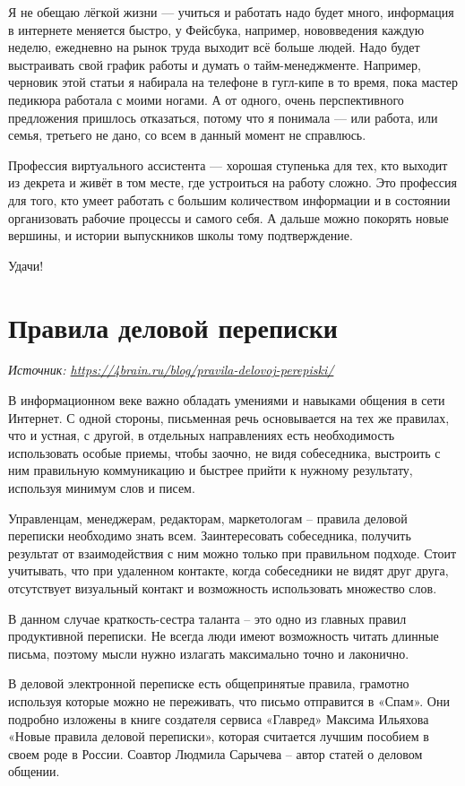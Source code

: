Я не обещаю лёгкой жизни --- учиться и работать надо будет много, информация в интернете меняется быстро, у Фейсбука, например, нововведения каждую неделю, ежедневно на рынок труда выходит всё больше людей. Надо будет выстраивать свой график работы и думать о тайм-менеджменте. Например, черновик этой статьи я набирала на телефоне в гугл-кипе в то время, пока мастер педикюра работала с моими ногами. А от одного, очень перспективного предложения пришлось отказаться, потому что я понимала --- или работа, или семья, третьего не дано, со всем в данный момент не справлюсь.

Профессия виртуального ассистента --- хорошая ступенька для тех, кто выходит из декрета и живёт в том месте, где устроиться на работу сложно. Это профессия для того, кто умеет работать с большим количеством информации и в состоянии организовать рабочие процессы и самого себя. А дальше можно покорять новые вершины, и истории выпускников школы тому подтверждение.

Удачи!

\section{Правила деловой переписки}

\textit{Источник: \url{https://4brain.ru/blog/pravila-delovoj-perepiski/}}

В информационном веке важно обладать умениями и навыками общения в сети Интернет. С одной стороны, письменная речь основывается на тех же правилах, что и устная, с другой, в отдельных направлениях есть необходимость использовать особые приемы, чтобы заочно, не видя собеседника, выстроить с ним правильную коммуникацию и быстрее прийти к нужному результату, используя минимум слов и писем.

Управленцам, менеджерам, редакторам, маркетологам – правила деловой переписки необходимо знать всем. Заинтересовать собеседника, получить результат от взаимодействия с ним можно только при правильном подходе. Стоит учитывать, что при удаленном контакте, когда собеседники не видят друг друга, отсутствует визуальный контакт и возможность использовать множество слов.

В данном случае краткость-сестра таланта – это одно из главных правил продуктивной переписки. Не всегда люди имеют возможность читать длинные письма, поэтому мысли нужно излагать максимально точно и лаконично.

В деловой электронной переписке есть общепринятые правила, грамотно используя которые можно не переживать, что письмо отправится в «Спам». Они подробно изложены в книге создателя сервиса «Главред» Максима Ильяхова «Новые правила деловой переписки», которая считается лучшим пособием в своем роде в России. Соавтор Людмила Сарычева – автор статей о деловом общении.


